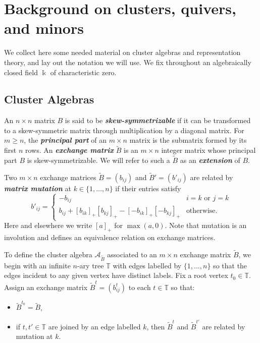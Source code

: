\documentclass[12pt]{amsart}
\newcommand{\newword}[1]{\textbf{\emph{#1}}}
\newcommand{\cA}{\mathcal{A}}
\newcommand{\TT}{\mathbb{T}}
\newcommand{\kk}{\Bbbk}
\theoremstyle{remark}
\numberwithin{equation}{section}
\numberwithin{figure}{section}
\begin{document}
\section{Background on clusters, quivers, and minors}

We collect here some needed material on cluster algebras and representation theory, and lay out the notation we will use.
We fix throughout an algebraically closed field $\kk$ of characteristic zero.

\subsection{Cluster Algebras}\label{sec:clusteralgebras}
An $n\times n$ matrix $B$ is said to be \newword{skew-symmetrizable} if it can be transformed to a skew-symmetric matrix through multiplication by a diagonal matrix.
For $m \geq n$, the \newword{principal part} of an $m \times n$ matrix is the submatrix formed by its first $n$ rows.
An \newword{exchange matrix} $\widetilde B$ is an $m\times n$ integer matrix whose principal part $B$ is skew-symmetrizable.
We will refer to such a $\widetilde B$ as an \newword{extension} of $B$.

Two $m\times n$ exchange matrices $\widetilde B=(b_{ij})$ and $\widetilde B'=(b'_{ij})$ are related by \newword{matrix mutation} at $k \in \{1,\dotsc,n\}$ if their entries satisfy 
\begin{equation}\label{eq:matrix mutation}
  b'_{ij} = \begin{cases}
  -b_{ij} & i = k \text{ or } j = k\\
  b_{ij} + [b_{ik}]_+ [b_{kj}]_+ - [-b_{ik}]_+ [-b_{kj}]_+ & \text{otherwise.}
  \end{cases}
\end{equation}
Here and elsewhere we write $[a]_+$ for $\max(a,0)$.
Note that mutation is an involution and defines an equivalence relation on exchange matrices.

To define the cluster algebra $\cA_{\widetilde B}$ associated to an $m \times n$ exchange matrix $\widetilde B$, we begin with an infinite $n$-ary tree $\TT$ with edges labelled by $\{1,\dotsc,n\}$ so that the edges incident to any given vertex have distinct labels.
Fix a root vertex $t_0 \in\TT$.
Assign an exchange matrix $\widetilde B^t=(b_{ij}^t)$ to each $t \in\TT$ so that:
\begin{itemize}
  \item $\widetilde B^{t_0} = \widetilde B$,
  \item if $t, t' \in\TT$ are joined by an edge labelled $k$, then $\widetilde B^t$ and $\widetilde B^{t'}$ are related by mutation at $k$.
\end{itemize}
\end{document}
